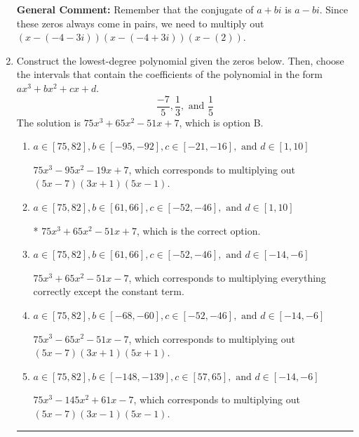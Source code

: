 \documentclass{extbook}[14pt]
\newcommand{\litem}[1]{\item #1

\rule{\textwidth}{0.4pt}}
\begin{document}
\begin{enumerate}
{\textbf{General Comment:} Remember that the conjugate of $a+bi$ is $a-bi$. Since these zeros always come in pairs, we need to multiply out $(x-(-4 - 3 i))(x-(-4 + 3 i))(x-(2))$.
}
\litem{
Construct the lowest-degree polynomial given the zeros below. Then, choose the intervals that contain the coefficients of the polynomial in the form $ax^3+bx^2+cx+d$.
\[ \frac{-7}{5}, \frac{1}{3}, \text{ and } \frac{1}{5} \]The solution is \( 75x^{3} +65 x^{2} -51 x + 7 \), which is option B.\begin{enumerate}[label=\Alph*.]
\item \( a \in [75, 82], b \in [-95, -92], c \in [-21, -16], \text{ and } d \in [1, 10] \)

$75x^{3} -95 x^{2} -19 x + 7$, which corresponds to multiplying out $(5x -7)(3x + 1)(5x -1)$.
\item \( a \in [75, 82], b \in [61, 66], c \in [-52, -46], \text{ and } d \in [1, 10] \)

* $75x^{3} +65 x^{2} -51 x + 7$, which is the correct option.
\item \( a \in [75, 82], b \in [61, 66], c \in [-52, -46], \text{ and } d \in [-14, -6] \)

$75x^{3} +65 x^{2} -51 x -7$, which corresponds to multiplying everything correctly except the constant term.
\item \( a \in [75, 82], b \in [-68, -60], c \in [-52, -46], \text{ and } d \in [-14, -6] \)

$75x^{3} -65 x^{2} -51 x -7$, which corresponds to multiplying out $(5x -7)(3x + 1)(5x + 1)$.
\item \( a \in [75, 82], b \in [-148, -139], c \in [57, 65], \text{ and } d \in [-14, -6] \)

$75x^{3} -145 x^{2} +61 x -7$, which corresponds to multiplying out $(5x -7)(3x -1)(5x -1)$.
\end{enumerate}

}
\end{enumerate}
\end{document}
